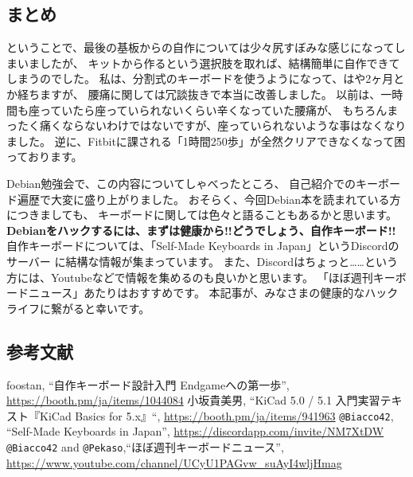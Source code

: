\documentclass[mingoth,a4paper]{jsarticle}
\begin{document}
\subsection{まとめ}

ということで、最後の基板からの自作については少々尻すぼみな感じになってしまいましたが、
キットから作るという選択肢を取れば、結構簡単に自作できてしまうのでした。
私は、分割式のキーボードを使うようになって、はや2ヶ月とか経ちますが、
腰痛に関しては冗談抜きで本当に改善しました。
以前は、一時間も座っていたら座っていられないくらい辛くなっていた腰痛が、
もちろんまったく痛くならないわけではないですが、座っていられないような事はなくなりました。
逆に、Fitbitに課される「1時間250歩」が全然クリアできなくなって困っております。

Debian勉強会で、この内容についてしゃべったところ、
自己紹介でのキーボード遍歴で大変に盛り上がりました。
おそらく、今回Debian本を読まれている方につきましても、
キーボードに関しては色々と語ることもあるかと思います。
\textbf{Debianをハックするには、まずは健康から!!どうでしょう、自作キーボード!!}
自作キーボードについては、「Self-Made Keyboards in Japan」というDiscordのサーバー\cite{discord}
に結構な情報が集まっています。
また、Discordはちょっと……という方には、Youtubeなどで情報を集めるのも良いかと思います。
「ほぼ週刊キーボードニュース」\cite{weekly}あたりはおすすめです。
本記事が、みなさまの健康的なハックライフに繋がると幸いです。

\subsection{参考文献}

\renewcommand{\refname}{\vspace*{-1.5zw}}
\begin{thebibliography}{9}
  foostan, ``自作キーボード設計入門 Endgameへの第一歩'', \url{https://booth.pm/ja/items/1044084}
  小坂貴美男, ``KiCad 5.0 / 5.1 入門実習テキスト『KiCad Basics for 5.x』``,
	 \url{https://booth.pm/ja/items/941963}
  \texttt{@Biacco42}, ``Self-Made Keyboards in Japan'', \url{https://discordapp.com/invite/NM7XtDW}
  \texttt{@Biacco42} and \texttt{@Pekaso},``ほぼ週刊キーボードニュース'', \url{https://www.youtube.com/channel/UCyU1PAGvw_suAyI4wljHmag}
\end{thebibliography}

\end{document}
